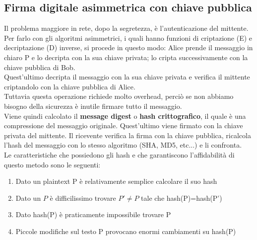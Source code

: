 \documentclass[10pt,a4paper,twoside]{article}
\begin{document}
\subsection{Firma digitale asimmetrica con chiave pubblica}
Il problema maggiore in rete, dopo la segretezza, è l'autenticazione del mittente. Per farlo con gli algoritmi asimmetrici, i quali hanno funzioni di criptazione (E) e decriptazione (D) inverse, si procede in questo modo: Alice prende il messaggio in chiaro P e lo decripta con la sua chiave privata; lo cripta successivamente con la chiave pubblica di Bob.\\
Quest'ultimo decripta il messaggio con la sua chiave privata e verifica il mittente criptandolo con la chiave pubblica di Alice.\\
Tuttavia questa operazione richiede molto overhead, perciò se non abbiamo bisogno della sicurezza è inutile firmare tutto il messaggio.\\
Viene quindi calcolato il \textbf{message digest} o \textbf{hash crittografico}, il quale è una compressione del messaggio originale. Quest'ultimo viene firmato con la chiave privata del mittente. Il ricevente verifica la firma con la chiave pubblica, ricalcola l'hash del messaggio con lo stesso algoritmo (SHA, MD5, etc...) e li confronta.\\
Le caratteristiche che possiedono gli hash e che garantiscono l'affidabilità di questo metodo sono le seguenti:
\begin{enumerate}
\item Dato un plaintext P è relativamente semplice calcolare il suo hash
\item Dato un $P$ è difficilissimo trovare $P' \neq P$ tale che hash(P)=hash(P')
\item Dato hash(P) è praticamente impossibile trovare P
\item Piccole modifiche sul testo P provocano enormi cambiamenti su hash(P)
\end{enumerate}
\end{document}
